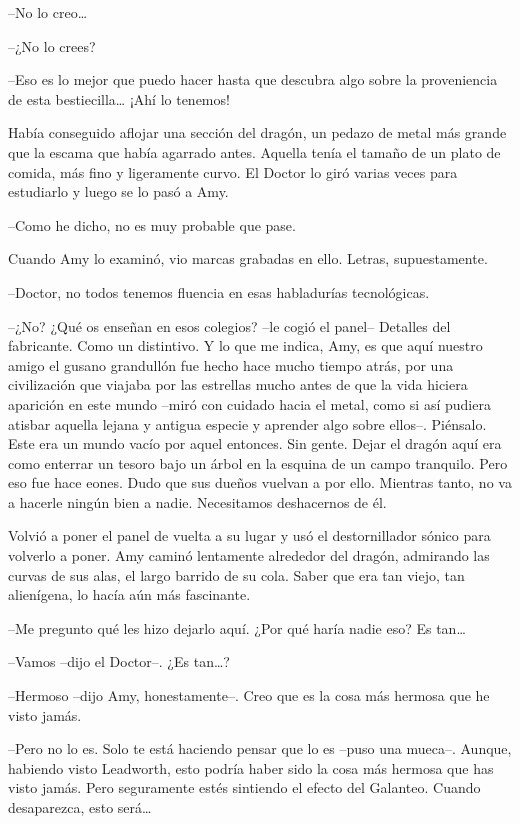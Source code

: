 {--No lo creo\ldots{}}

{--¿No lo crees?}

{--Eso es lo mejor que puedo hacer hasta que descubra algo sobre la
	proveniencia de esta bestiecilla\ldots{} ¡Ahí lo tenemos!}

{Había conseguido aflojar una sección del dragón, un pedazo de metal más
	grande que la escama que había agarrado antes. Aquella tenía el tamaño
	de un plato de comida, más fino y ligeramente curvo. El Doctor lo giró
varias veces para estudiarlo y luego se lo pasó a Amy.}

{--Como he dicho, no es muy probable que pase.}

{Cuando Amy lo examinó, vio marcas grabadas en ello. Letras,
supuestamente.}

{--Doctor, no todos tenemos fluencia en esas habladurías
tecnológicas.}

{--¿No? ¿Qué os enseñan en esos colegios? --le cogió el panel--
	Detalles del fabricante. Como un distintivo. Y lo que me indica, Amy, es
	que aquí nuestro amigo el gusano grandullón fue hecho hace mucho tiempo
	atrás, por una civilización que viajaba por las estrellas mucho antes de
	que la vida hiciera aparición en este mundo --miró con cuidado hacia el
	metal, como si así pudiera atisbar aquella lejana y antigua especie y
	aprender algo sobre ellos--. Piénsalo. Este era un mundo vacío por aquel
	entonces. Sin gente. Dejar el dragón aquí era como enterrar un tesoro
	bajo un árbol en la esquina de un campo tranquilo. Pero eso fue hace
	eones. Dudo que sus dueños vuelvan a por ello. Mientras tanto, no va a
hacerle ningún bien a nadie. Necesitamos deshacernos de él.}

{Volvió a poner el panel de vuelta a su lugar y usó el destornillador
	sónico para volverlo a poner. Amy caminó lentamente alrededor del
	dragón, admirando las curvas de sus alas, el largo barrido de su cola.
Saber que era tan viejo, tan alienígena, lo hacía aún más fascinante.}

{--Me pregunto qué les hizo dejarlo aquí. ¿Por qué haría nadie eso? Es
	tan\ldots{}}

{--Vamos --dijo el Doctor--. ¿Es tan\ldots{}?}

{--Hermoso --dijo Amy, honestamente--. Creo que es la cosa más hermosa
que he visto jamás.}

{--Pero no lo es. Solo te está haciendo pensar que lo es --puso una
	mueca--. Aunque, habiendo visto Leadworth, esto podría haber sido la
	cosa más hermosa que has visto jamás. Pero seguramente estés sintiendo
	el efecto del Galanteo. Cuando desaparezca, esto será\ldots{}}

